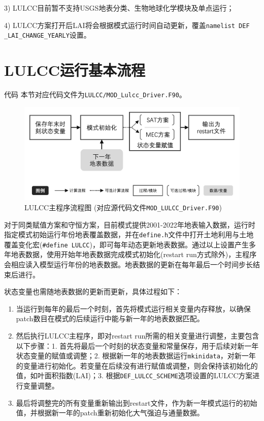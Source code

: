 3) LULCC目前暂不支持USGS地表分类、生物地球化学模块及单点运行；

4) LULCC方案打开后LAI将会根据模式运行时间自动更新，覆盖\texttt{namelist DEF\- \_LAI\_CHANGE\_YEARLY}设置。


\section{LULCC运行基本流程}
\begin{mymdframed}{代码}
  本节对应代码文件为\texttt{LULCC/MOD\_Lulcc\_Driver.F90}。
\end{mymdframed}

{
  \begin{figure}[htbp]
    \centering
    \includegraphics[width=0.85\columnwidth]{Figures/土地利用与土地覆盖变化模拟/LULCCDRIVER流程图_v2.png}
    \caption[LULCC主程序流程图]{LULCC主程序流程图 (对应源代码文件\texttt{MOD\_LULCC\_Driver.F90})}
    \label{fig:LULCC主程序流程图}
  \end{figure}
}

对于同类赋值方案和守恒方案，目前模式提供2001-2022年地表输入数据，运行时指定模式初始运行年份地表覆盖数据，并在\texttt{define.h}文件中打开土地利用与土地覆盖变化宏(\texttt{\#define LULCC})，即可每年动态更新地表数据。通过以上设置产生多年地表数据，使用开始年地表数据完成模式初始化(restart run方式除外)，主程序会相应读入模型运行年份的地表数据。地表数据的更新在每年最后一个时间步长结束后进行。

状态变量也需随地表数据的更新而更新，具体过程如下：

\begin{enumerate}
  \item 当运行到每年的最后一个时刻，首先将模式运行相关变量内存释放，以确保patch数目在模式的后续运行中能与新一年的地表数据匹配。

  \item 然后执行LULCC主程序，即对restart run所需的相关变量进行调整，主要包含以下步骤：1. 首先将最后一个时刻的状态变量和常量保存，用于后续对新一年状态变量的赋值或调整；2. 根据新一年的地表数据运行\texttt{mkinidata}，对新一年的变量进行初始化。若变量在后续没有进行赋值或调整，则会保持该初始化的值，如叶面积指数(LAI)；3. 根据\texttt{DEF\_LULCC\_SCHEME}选项设置的LULCC方案进行变量调整。

  \item 最后将调整完的所有变量重新输出到restart文件，作为新一年模式运行的初始值，并根据新一年的patch重新初始化大气强迫与通量数据。
\end{enumerate}


